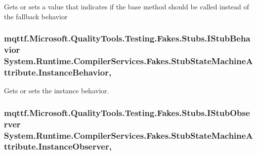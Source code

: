 Gets or sets a value that indicates if the base method should be called instead of the fallback behavior

\hypertarget{class_system_1_1_runtime_1_1_compiler_services_1_1_fakes_1_1_stub_state_machine_attribute_a89271797f10b18cbea3f837d3e6325d1}{
\subsubsection[{Instance\-Behavior}]{\setlength{\rightskip}{0pt plus 5cm}mqttf.\-Microsoft.\-Quality\-Tools.\-Testing.\-Fakes.\-Stubs.\-I\-Stub\-Behavior System.\-Runtime.\-Compiler\-Services.\-Fakes.\-Stub\-State\-Machine\-Attribute.\-Instance\-Behavior\hspace{0.3cm}{\ttfamily [get]}, {\ttfamily [set]}}}\label{class_system_1_1_runtime_1_1_compiler_services_1_1_fakes_1_1_stub_state_machine_attribute_a89271797f10b18cbea3f837d3e6325d1}


Gets or sets the instance behavior.

\hypertarget{class_system_1_1_runtime_1_1_compiler_services_1_1_fakes_1_1_stub_state_machine_attribute_a6139d44bc4faf50820b7180449124648}{
\subsubsection[{Instance\-Observer}]{\setlength{\rightskip}{0pt plus 5cm}mqttf.\-Microsoft.\-Quality\-Tools.\-Testing.\-Fakes.\-Stubs.\-I\-Stub\-Observer System.\-Runtime.\-Compiler\-Services.\-Fakes.\-Stub\-State\-Machine\-Attribute.\-Instance\-Observer\hspace{0.3cm}{\ttfamily [get]}, {\ttfamily [set]}}}\label{class_system_1_1_runtime_1_1_compiler_services_1_1_fakes_1_1_stub_state_machine_attribute_a6139d44bc4faf50820b7180449124648}


